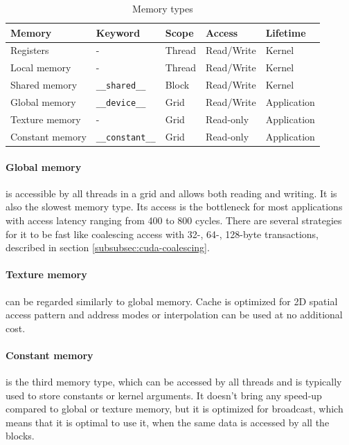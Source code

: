\begin{table}
\centering
\begin{tabular}{| l | l | l | l | l |}
\hline
Memory & Keyword & Scope & Access & Lifetime \\
\hline
Registers & - & Thread & Read/Write & Kernel \\
\hline
Local memory & - & Thread & Read/Write & Kernel \\
\hline
Shared memory & \verb|__shared__| & Block & Read/Write &  Kernel \\
\hline
Global memory & \verb|__device__| & Grid & Read/Write & Application \\
\hline
Texture memory & - & Grid & Read-only & Application \\
\hline
Constant memory & \verb|__constant__| & Grid & Read-only & Application \\
\hline
\end{tabular}
\caption{Memory types}
\end{table}

\paragraph{Global memory} is accessible by all threads in a grid and allows both reading and writing. It is also the slowest memory type. Its access is the bottleneck for most applications with access latency ranging from 400 to 800 cycles. There are several strategies for it to be fast like coalescing access with 32-, 64-, 128-byte transactions, described in section \ref{subsubsec:cuda-coalescing}.

\paragraph{Texture memory} can be regarded similarly to global memory. Cache is optimized for 2D spatial access pattern and address modes or interpolation can be used at no additional cost.

\paragraph{Constant memory} is the third memory type, which can be accessed by all threads and is typically used to store constants or kernel arguments. It doesn't bring any speed-up compared to global or texture memory, but it is optimized for broadcast, which means that it is optimal to use it, when the same data is accessed by all the blocks.

